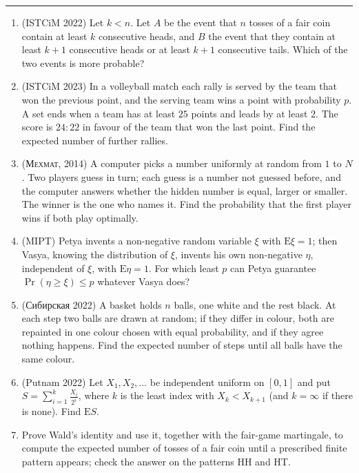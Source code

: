 \documentclass[11pt,a4paper]{article}
\renewcommand{\le}{\leqslant}
\renewcommand{\ge}{\geqslant}
\begin{document}
\noindent\rule{\textwidth}{0.4pt}\par\vspace{4pt}
\begin{enumerate}
\item (ISTCiM 2022) Let $k<n$. Let $A$ be the event that $n$ tosses of a fair coin contain at least
$k$ consecutive heads, and $B$ the event that they contain at least $k+1$ consecutive heads or at
least $k+1$ consecutive tails. Which of the two events is more probable?

\item (ISTCiM 2023) In a volleyball match each rally is served by the team that won the previous
point, and the serving team wins a point with probability $p$. A set ends when a team has at least
$25$ points and leads by at least $2$. The score is $24:22$ in favour of the team that won the last
point. Find the expected number of further rallies.

\item (\foreignlanguage{russian}{\textsc{Мехмат}}, 2014) A computer picks a number uniformly at random
from $1$ to $N$. Two players guess in turn; each guess is a number not guessed before, and the
computer answers whether the hidden number is equal, larger or smaller. The winner is the one who
names it. Find the probability that the first player wins if both play optimally.

\item (MIPT) Petya invents a non-negative random variable $\xi$ with $\mathrm E\xi=1$; then Vasya,
knowing the distribution of $\xi$, invents his own non-negative $\eta$, independent of $\xi$, with
$\mathrm E\eta=1$. For which least $p$ can Petya guarantee $\Pr(\eta\ge\xi)\le p$ whatever Vasya does?

\item (\foreignlanguage{russian}{Сибирская} 2022) A basket holds $n$ balls, one white and the rest
black. At each step two balls are drawn at random; if they differ in colour, both are repainted in one
colour chosen with equal probability, and if they agree nothing happens. Find the expected number of
steps until all balls have the same colour.

\item (Putnam 2022) Let $X_1,X_2,\dots$ be independent uniform on $[0,1]$ and put
$S=\sum_{i=1}^k\frac{X_i}{2^i}$, where $k$ is the least index with $X_k<X_{k+1}$ (and $k=\infty$ if
there is none). Find $\mathrm ES$.

\item Prove Wald's identity and use it, together with the fair-game martingale, to compute the expected
number of tosses of a fair coin until a prescribed finite pattern appears; check the answer on the
patterns HH and HT.


\end{enumerate}
\end{document}
